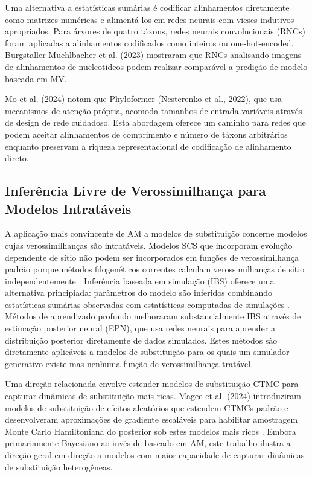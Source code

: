 Uma alternativa a estatísticas sumárias é codificar alinhamentos diretamente como matrizes numéricas e alimentá-los em redes neurais com vieses indutivos apropriados. Para árvores de quatro táxons, redes neurais convolucionais (RNCs) foram aplicadas a alinhamentos codificados como inteiros ou one-hot-encoded. Burgstaller-Muehlbacher et al. (2023) mostraram que RNCs analisando imagens de alinhamentos de nucleotídeos podem realizar comparável a predição de modelo baseada em MV.

Mo et al. (2024) notam que Phyloformer (Nesterenko et al., 2022), que usa mecanismos de atenção própria, acomoda tamanhos de entrada variáveis através de design de rede cuidadoso. Esta abordagem oferece um caminho para redes que podem aceitar alinhamentos de comprimento e número de táxons arbitrários enquanto preservam a riqueza representacional de codificação de alinhamento direto.

\subsection{Inferência Livre de Verossimilhança para Modelos Intratáveis}

A aplicação mais convincente de AM a modelos de substituição concerne modelos cujas verossimilhanças são intratáveis. Modelos SCS que incorporam evolução dependente de sítio não podem ser incorporados em funções de verossimilhança padrão porque métodos filogenéticos correntes calculam verossimilhanças de sítio independentemente \parencite{yang2006}. Inferência baseada em simulação (IBS) oferece uma alternativa principiada: parâmetros do modelo são inferidos combinando estatísticas sumárias observadas com estatísticas computadas de simulações \parencite{cranmer2020}. Métodos de aprendizado profundo melhoraram substancialmente IBS através de estimação posterior neural (EPN), que usa redes neurais para aprender a distribuição posterior diretamente de dados simulados. Estes métodos são diretamente aplicáveis a modelos de substituição para os quais um simulador generativo existe mas nenhuma função de verossimilhança tratável.

Uma direção relacionada envolve estender modelos de substituição CTMC para capturar dinâmicas de substituição mais ricas. Magee et al. (2024) introduziram modelos de substituição de efeitos aleatórios que estendem CTMCs padrão e desenvolveram aproximações de gradiente escaláveis para habilitar amostragem Monte Carlo Hamiltoniana do posterior sob estes modelos mais ricos \parencite{magee2024}. Embora primariamente Bayesiano ao invés de baseado em AM, este trabalho ilustra a direção geral em direção a modelos com maior capacidade de capturar dinâmicas de substituição heterogêneas.

